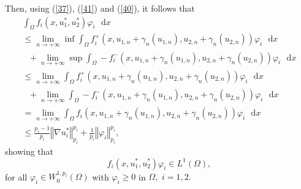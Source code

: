 \documentclass[11pt]{amsart}
\theoremstyle{definition}
\theoremstyle{remark}
\numberwithin{equation}{section}
\begin{document}
Then, using (\ref{37}), (\ref{41}) and (\ref{40}), it follows that%
\begin{equation*}
\begin{array}{l}
\int_{\Omega }f_{i}(x,u_{1}^{\ast },u_{2}^{\ast })\varphi _{i}\text{ }%
\mathrm{d}x \\ 
\leq \lim_{n\rightarrow +\infty }\inf \int_{\Omega
}f_{i}^{+}(x,u_{1,n}+\gamma _{n}(u_{1,n}),u_{2,n}+\gamma
_{n}(u_{2,n}))\varphi _{i}\text{ }\mathrm{d}x \\ 
\text{ \ \ }+\lim_{n\rightarrow +\infty }\sup \int_{\Omega
}-f_{i}^{-}(x,u_{1,n}+\gamma _{n}(u_{1,n}),u_{2,n}+\gamma
_{n}(u_{2,n}))\varphi _{i}\text{ }\mathrm{d}x \\ 
\leq \lim_{n\rightarrow +\infty }\int_{\Omega }f_{i}^{+}(x,u_{1,n}+\gamma
_{n}(u_{1,n}),u_{2,n}+\gamma _{n}(u_{2,n}))\varphi _{i}\text{ }\mathrm{d}x
\\ 
\text{ \ \ }+\lim_{n\rightarrow +\infty }\int_{\Omega
}-f_{i}^{-}(x,u_{1,n}+\gamma _{n}(u_{1,n}),u_{2,n}+\gamma
_{n}(u_{2,n}))\varphi _{i}\text{ }\mathrm{d}x \\ 
=\lim_{n\rightarrow +\infty }\int_{\Omega }f_{i}(x,u_{1,n}+\gamma
_{n}(u_{1,n}),u_{2,n}+\gamma _{n}(u_{2,n}))\varphi _{i}\text{ }\mathrm{d}x
\\ 
\leq \frac{p_{i}-1}{p_{i}}\left\Vert \nabla u_{i}^{\ast }\right\Vert
_{p_{i}}^{p_{i}}+\frac{1}{p_{i}}\left\Vert \varphi _{i}\right\Vert
_{p_{i}}^{p_{i}},%
\end{array}%
\end{equation*}%
showing that%
\begin{equation}
f_{i}(x,u_{1}^{\ast },u_{2}^{\ast })\varphi _{i}\in L^{1}(\Omega ),
\label{43}
\end{equation}%
for all $\varphi _{i}\in W_{0}^{1,p_{i}}(\Omega )$ with $\varphi _{i}\geq 0$
in $\Omega ,$ $i=1,2.$
\end{document}
